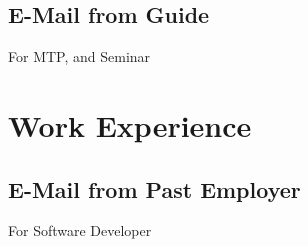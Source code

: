 \documentclass{article}
\begin{document}
	\subsection{E-Mail from Guide}
		For MTP, and Seminar
		\begin{figure}[h]
		\end{figure}
\newpage
\section{Work Experience}
	\subsection{E-Mail from Past Employer}
		For Software Developer
		\begin{figure}[h]
		\end{figure}
\newpage
\end{document}
